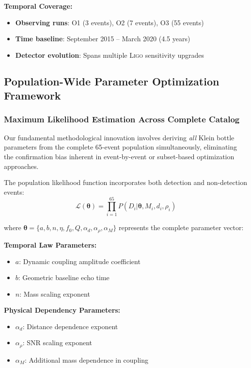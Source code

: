 \documentclass[reprint,amsmath,amssymb,aps,prd]{revtex4-2}
\newcommand{\LIGO}{\textsc{Ligo}\xspace}
\begin{document}
\textbf{Temporal Coverage:}
\begin{itemize}
\item \textbf{Observing runs}: O1 (3 events), O2 (7 events), O3 (55 events)
\item \textbf{Time baseline}: September 2015 -- March 2020 (4.5 years)
\item \textbf{Detector evolution}: Spans multiple \LIGO sensitivity upgrades
\end{itemize}

\subsection{Population-Wide Parameter Optimization Framework}

\subsubsection{Maximum Likelihood Estimation Across Complete Catalog}

Our fundamental methodological innovation involves deriving \textit{all} Klein bottle parameters from the complete 65-event population simultaneously, eliminating the confirmation bias inherent in event-by-event or subset-based optimization approaches.

The population likelihood function incorporates both detection and non-detection events:
\begin{equation}
\mathcal{L}(\boldsymbol{\theta}) = \prod_{i=1}^{65} P(D_i | \boldsymbol{\theta}, M_i, d_i, \rho_i)
\label{eq:full_population_likelihood}
\end{equation}

where $\boldsymbol{\theta} = \{a, b, n, \eta, f_0, Q, \alpha_d, \alpha_\rho, \alpha_M\}$ represents the complete parameter vector:

\textbf{Temporal Law Parameters:}
\begin{itemize}
\item $a$: Dynamic coupling amplitude coefficient
\item $b$: Geometric baseline echo time  
\item $n$: Mass scaling exponent
\end{itemize}

\textbf{Physical Dependency Parameters:}
\begin{itemize}
\item $\alpha_d$: Distance dependence exponent
\item $\alpha_\rho$: SNR scaling exponent
\item $\alpha_M$: Additional mass dependence in coupling
\end{itemize}
\end{document}
